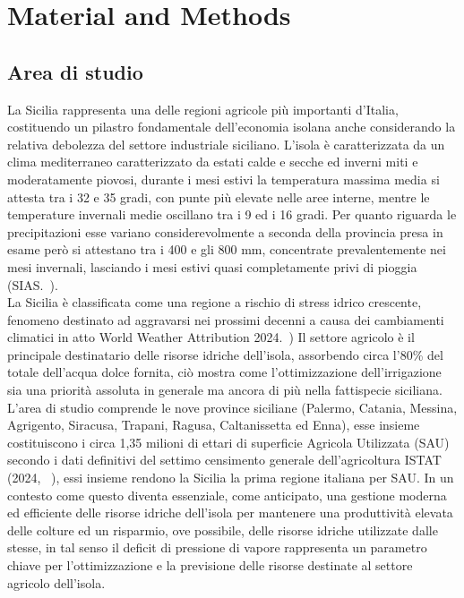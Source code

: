 \chapter{Material and Methods}
\section{Area di studio}
La Sicilia rappresenta una delle regioni agricole più importanti d'Italia, costituendo un pilastro fondamentale dell'economia isolana anche considerando la relativa debolezza del settore industriale siciliano. L'isola è caratterizzata da un clima mediterraneo caratterizzato da estati calde e secche ed inverni miti e moderatamente piovosi, durante i mesi estivi la temperatura massima media si attesta tra i 32 e 35 gradi, con punte più elevate nelle aree interne, mentre le temperature invernali medie oscillano tra i 9 ed i 16 gradi. Per quanto riguarda le precipitazioni esse variano considerevolmente a seconda della provincia presa in esame però si attestano tra i 400 e gli 800 mm, concentrate prevalentemente nei mesi invernali, lasciando i mesi estivi quasi completamente privi di pioggia (SIAS.~\cite{sias2026clima}).\\
La Sicilia è classificata come una regione a rischio di stress idrico crescente, fenomeno destinato ad aggravarsi nei prossimi decenni a causa dei cambiamenti climatici in atto World Weather Attribution 2024.~\cite{wwa2024sicily}) Il settore agricolo è il principale destinatario delle risorse idriche dell'isola, assorbendo circa l'80\% del totale dell'acqua dolce fornita, ciò mostra come l'ottimizzazione dell'irrigazione sia una priorità assoluta in generale ma ancora di più nella fattispecie siciliana.\\
L'area di studio comprende le nove province siciliane (Palermo, Catania, Messina, Agrigento, Siracusa, Trapani, Ragusa, Caltanissetta ed Enna), esse insieme costituiscono i circa 1,35 milioni di ettari di superficie Agricola Utilizzata (SAU) secondo i dati definitivi del settimo censimento generale dell'agricoltura ISTAT (2024, ~\cite{istat2024censimento}), essi insieme rendono la Sicilia la prima regione italiana per SAU. In un contesto come questo diventa essenziale, come anticipato, una gestione moderna ed efficiente delle risorse idriche dell'isola per mantenere una produttività elevata delle colture ed un risparmio, ove possibile, delle risorse idriche utilizzate dalle stesse, in tal senso il deficit di pressione di vapore rappresenta un parametro chiave per l'ottimizzazione e la previsione delle risorse destinate al settore agricolo dell'isola. \\

